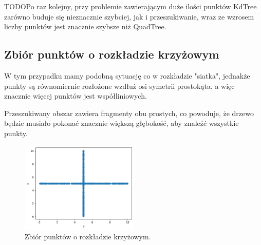 \documentclass{lab}
\begin{document}
TODOPo raz kolejny, przy problemie zawierającym duże ilości punktów KdTree zarówno buduje się nieznacznie szybciej, jak i przeszukiwanie, wraz ze wzrosem liczby punktów jest znacznie szybsze niż QuadTree.

\newpage
\subsection{Zbiór punktów o rozkładzie krzyżowym}
W tym przypadku mamy podobną sytuację co w rozkładzie "siatka", jednakże punkty są równomiernie rozłożone wzdłuż osi symetrii prostokąta, a więc znacznie więcej punktów jest współliniowych.

Przeszukiwany obszar zawiera fragmenty obu prostych, co powoduje, że drzewo będzie musiało pokonać znacznie większą głębokość, aby znaleźć wszystkie punkty.

\begin{figure}[H]
  \centering
  \includegraphics[width=0.5\textwidth]{resources/cross.png}
  \caption{Zbiór punktów o rozkładzie krzyżowym.}
  \label{fig:cross}
\end{figure}
\end{document}
